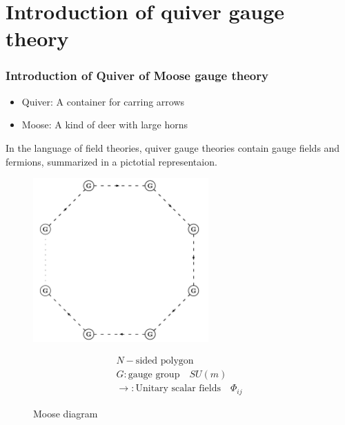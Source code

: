 \documentclass{beamer}
\begin{document}
\section{Introduction of quiver gauge theory}
\begin{frame}
    \frametitle{Introduction of Quiver of Moose gauge theory}
    \begin{itemize}
        \item Quiver: A container for carring arrows
        \item Moose: A kind of deer with large horns 
    \end{itemize}
    

    In the language of field theories, quiver gauge theories contain gauge fields and fermions, summarized in a pictotial representaion.
    \begin{figure}
        \centering
        \begin{minipage}{0.45\textwidth}
            \centering
            \includegraphics[width=0.6\textwidth]{Moosed.jpeg}
            \caption*{Moose diagram}
        \end{minipage}
        \hspace{1em}
        \begin{minipage}{0.3\textwidth}
            \begin{gather*}
                N-\text{sided polygon}\\
                G: \text{gauge group} \quad SU(m)\\
                \rightarrow : \text{Unitary scalar fields}\quad \Phi_{ij} 
            \end{gather*}
        \end{minipage}
        
    \end{figure}
\end{frame}
\end{document}
